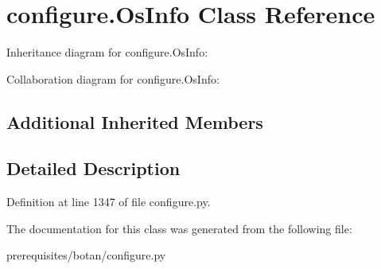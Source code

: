 \hypertarget{classconfigure_1_1_os_info}{}\section{configure.\+Os\+Info Class Reference}
\label{classconfigure_1_1_os_info}


Inheritance diagram for configure.\+Os\+Info\+:


Collaboration diagram for configure.\+Os\+Info\+:
\subsection*{Additional Inherited Members}


\subsection{Detailed Description}


Definition at line 1347 of file configure.\+py.



The documentation for this class was generated from the following file\+:\begin{DoxyCompactItemize}
\item 
prerequisites/botan/configure.\+py\end{DoxyCompactItemize}
